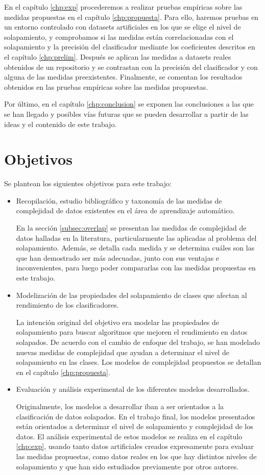 \documentclass[a4paper,12pt]{report}
\theoremstyle{definition}
\begin{document}
En el capítulo \ref{chp:exp} procederemos a realizar pruebas empíricas sobre las medidas propuestas en el capítulo \ref{chp:propuesta}. Para ello, haremos pruebas en un entorno controlado con datasets artificiales en los que se elige el nivel de solapamiento, y comprobamos si las medidas están correlacionadas con el solapamiento y la precisión del clasificador mediante los coeficientes descritos en el capítulo \ref{chp:prelim}. Después se aplican las medidas a datasets reales obtenidos de un repositorio y se contrastan con la precisión del clasificador y con alguna de las medidas preexistentes. Finalmente, se comentan los resultados obtenidos en las pruebas empíricas sobre las medidas propuestas.

Por último, en el capítulo \ref{chp:conclusion} se exponen las conclusiones a las que se han llegado y posibles vías futuras que se pueden desarrollar a partir de las ideas y el contenido de este trabajo.

\section{Objetivos}

Se plantean los siguientes objetivos para este trabajo:
\begin{itemize}
\item Recopilación, estudio bibliográfico y taxonomía de las medidas de complejidad de datos existentes en el área de aprendizaje automático.

  En la sección \ref{subsec:overlap} se presentan las medidas de complejidad de datos halladas en la literatura, particularmente las aplicadas al problema del solapamiento. Además, se detalla cada medida y se determina cuáles son las que han demostrado ser más adecuadas, junto con sus ventajas e inconvenientes, para luego poder compararlas con las medidas propuestas en este trabajo.

\item Modelización de las propiedades del solapamiento de clases que afectan al rendimiento de los clasificadores.

  La intención original del objetivo era modelar las propiedades de solapamiento para buscar algoritmos que mejoren el rendimiento en datos solapados. De acuerdo con el cambio de enfoque del trabajo, se han modelado nuevas medidas de complejidad que ayudan a determinar el nivel de solapamiento en las clases. Los modelos de complejidad propuestos se detallan en el capítulo \ref{chp:propuesta}.

\item Evaluación y análisis experimental de los diferentes modelos desarrollados.

  Originalmente, los modelos a desarrollar iban a ser orientados a la clasificación de datos solapados. En el trabajo final, los modelos presentados están orientados a determinar el nivel de solapamiento y complejidad de los datos. El análisis experimental de estos modelos se realiza en el capítulo \ref{chp:exp}, usando tanto datos artificiales creados expresamente para evaluar las medidas propuestas, como datos reales en los que hay distintos niveles de solapamiento y que han sido estudiados previamente por otros autores.
\end{itemize}
\end{document}
